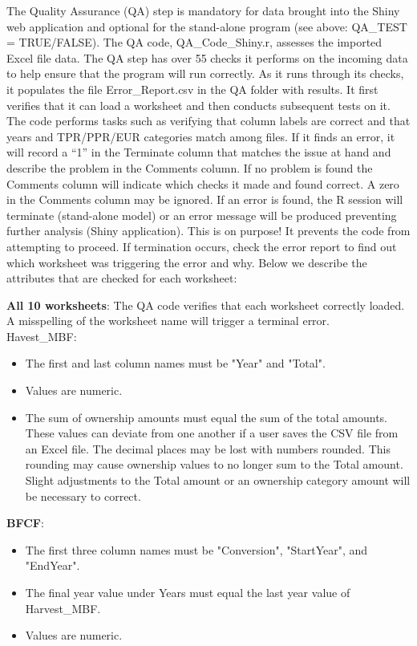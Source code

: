 \documentclass[
  openany]{book}
\providecommand{\tightlist}{%
  \setlength{\itemsep}{0pt}\setlength{\parskip}{0pt}}
\begin{document}
The Quality Assurance (QA) step is mandatory for data brought into the
Shiny web application and optional for the stand-alone program (see
above: QA\_TEST = TRUE/FALSE). The QA code, QA\_Code\_Shiny.r, assesses
the imported Excel file data. The QA step has over 55 checks it performs
on the incoming data to help ensure that the program will run correctly.
As it runs through its checks, it populates the file Error\_Report.csv
in the QA folder with results. It first verifies that it can load a
worksheet and then conducts subsequent tests on it. The code performs
tasks such as verifying that column labels are correct and that years
and TPR/PPR/EUR categories match among files. If it finds an error, it
will record a ``1'' in the Terminate column that matches the issue at
hand and describe the problem in the Comments column. If no problem is
found the Comments column will indicate which checks it made and found
correct. A zero in the Comments column may be ignored. If an error is
found, the R session will terminate (stand-alone model) or an error
message will be produced preventing further analysis (Shiny
application). This is on purpose! It prevents the code from attempting
to proceed. If termination occurs, check the error report to find out
which worksheet was triggering the error and why. Below we describe the
attributes that are checked for each worksheet:

\textbf{All 10 worksheets}: The QA code verifies that each worksheet
correctly loaded. A misspelling of the worksheet name will trigger a
terminal error.\\
Havest\_MBF:

\begin{itemize}
\tightlist
\item
  The first and last column names must be "Year" and "Total".\\
\item
  Values are numeric.\\
\item
  The sum of ownership amounts must equal the sum of the total amounts.
  These values can deviate from one another if a user saves the CSV file
  from an Excel file. The decimal places may be lost with numbers
  rounded. This rounding may cause ownership values to no longer sum to
  the Total amount. Slight adjustments to the Total amount or an
  ownership category amount will be necessary to correct.
\end{itemize}

\textbf{BFCF}:

\begin{itemize}
\tightlist
\item
  The first three column names must be "Conversion", "StartYear", and
  "EndYear".\\
\item
  The final year value under Years must equal the last year value of
  Harvest\_MBF.\\
\item
  Values are numeric.
\end{itemize}
\end{document}

